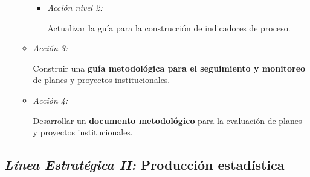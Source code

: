 \documentclass[
]{book}
\begin{document}
\begin{itemize}
\begin{itemize}
    \begin{itemize}
    \item
      \emph{Acción nivel 2:}

      Actualizar la guía para la construcción de indicadores de proceso.
    \end{itemize}
  \item
    \emph{Acción 3:}

    Construir una \textbf{guía metodológica para el seguimiento y monitoreo} de planes y proyectos institucionales.
  \item
    \emph{Acción 4:}

    Desarrollar un \textbf{documento metodológico} para la evaluación de planes y proyectos institucionales.
  \end{itemize}
\end{itemize}

\hypertarget{luxednea-estratuxe9gica-ii-producciuxf3n-estaduxedstica}{%
\subsection{\texorpdfstring{\emph{Línea Estratégica II:} Producción estadística}{Línea Estratégica II: Producción estadística}}\label{luxednea-estratuxe9gica-ii-producciuxf3n-estaduxedstica}}
\end{document}
